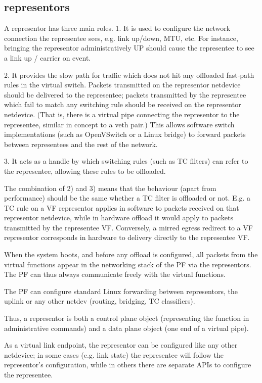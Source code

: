 \documentclass[letterpaper]{article}
\begin{document}
\subsection{representors}

A representor has three main roles.
1. It is used to configure the network connection the representee sees, e.g.
   link up/down, MTU, etc.  For instance, bringing the representor
administratively UP should cause the representee to see a link up / carrier
   on event.

2. It provides the slow path for traffic which does not hit any offloaded
   fast-path rules in the virtual switch.  Packets transmitted on the
   representor netdevice should be delivered to the representee; packets
  transmitted by the representee which fail to match any switching rule should
  be received on the representor netdevice.  (That is, there is a virtual pipe 
  connecting the representor to the representee, similar in concept to a veth
  pair.)
  This allows software switch implementations (such as OpenVSwitch or a Linux
   bridge) to forward packets between representees and the rest of the network.
   
 3. It acts as a handle by which switching rules (such as TC filters) can refer
 to the representee, allowing these rules to be offloaded.

 
 The combination of 2) and 3) means that the behaviour (apart from performance)
 should be the same whether a TC filter is offloaded or not.  E.g. a TC rule
 on a VF representor applies in software to packets received on that representor
 netdevice, while in hardware offload it would apply to packets transmitted by
  the representee VF.  Conversely, a mirred egress redirect to a VF representor
  corresponds in hardware to delivery directly to the representee VF.
 
When the system boots, and before any offload is configured, all packets from
the virtual functions appear in the networking stack of the PF via the
representors.  The PF can thus always communicate freely with the virtual functions.

The PF can configure standard Linux forwarding between representors, the uplink
or any other netdev (routing, bridging, TC classifiers).

Thus, a representor is both a control plane object (representing the function in
administrative commands) and a data plane object (one end of a virtual pipe).

As a virtual link endpoint, the representor can be configured like any other
netdevice; in some cases (e.g. link state) the representee will follow the
representor's configuration, while in others there are separate APIs to
configure the representee.
 
\end{document}
